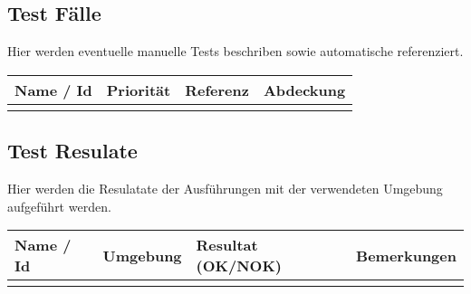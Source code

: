 \subsection{Test Fälle}
Hier werden eventuelle manuelle Tests beschriben sowie automatische referenziert. 

\begin{center}
	\begin{tabular}{ | l | l | l | l | }
	\hline
	Name / Id & Priorität & Referenz & Abdeckung \\
	\hline
	 & & & \\
	\hline
	\end{tabular}
\end{center}

\subsection{Test Resulate}
Hier werden die Resulatate der Ausführungen mit der verwendeten Umgebung aufgeführt werden.

\begin{center}
	\begin{tabular}{ | l | l | l | l | }
	\hline
	Name / Id & Umgebung & Resultat (OK/NOK) & Bemerkungen \\
	\hline
	 & & & \\
	\hline
	\end{tabular}
\end{center}



